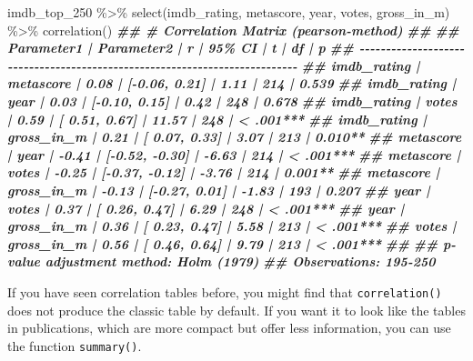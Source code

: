 \documentclass[
]{book}
\newenvironment{Shaded}{\begin{snugshade}}{\end{snugshade}}
\newcommand{\DocumentationTok}[1]{\textcolor[rgb]{0.56,0.35,0.01}{\textbf{\textit{#1}}}}
\newcommand{\FunctionTok}[1]{\textcolor[rgb]{0.00,0.00,0.00}{#1}}
\newcommand{\NormalTok}[1]{#1}
\newcommand{\SpecialCharTok}[1]{\textcolor[rgb]{0.00,0.00,0.00}{#1}}
\begin{document}
\begin{Shaded}
\begin{Highlighting}[]
\NormalTok{imdb\_top\_250 }\SpecialCharTok{\%\textgreater{}\%}
  \FunctionTok{select}\NormalTok{(imdb\_rating, metascore, year, votes, gross\_in\_m) }\SpecialCharTok{\%\textgreater{}\%}
  \FunctionTok{correlation}\NormalTok{()}
\DocumentationTok{\#\# \# Correlation Matrix (pearson{-}method)}
\DocumentationTok{\#\# }
\DocumentationTok{\#\# Parameter1  | Parameter2 |     r |         95\% CI |     t |  df |         p}
\DocumentationTok{\#\# {-}{-}{-}{-}{-}{-}{-}{-}{-}{-}{-}{-}{-}{-}{-}{-}{-}{-}{-}{-}{-}{-}{-}{-}{-}{-}{-}{-}{-}{-}{-}{-}{-}{-}{-}{-}{-}{-}{-}{-}{-}{-}{-}{-}{-}{-}{-}{-}{-}{-}{-}{-}{-}{-}{-}{-}{-}{-}{-}{-}{-}{-}{-}{-}{-}{-}{-}{-}{-}{-}{-}{-}{-}{-}{-}}
\DocumentationTok{\#\# imdb\_rating |  metascore |  0.08 | [{-}0.06,  0.21] |  1.11 | 214 | 0.539    }
\DocumentationTok{\#\# imdb\_rating |       year |  0.03 | [{-}0.10,  0.15] |  0.42 | 248 | 0.678    }
\DocumentationTok{\#\# imdb\_rating |      votes |  0.59 | [ 0.51,  0.67] | 11.57 | 248 | \textless{} .001***}
\DocumentationTok{\#\# imdb\_rating | gross\_in\_m |  0.21 | [ 0.07,  0.33] |  3.07 | 213 | 0.010**  }
\DocumentationTok{\#\# metascore   |       year | {-}0.41 | [{-}0.52, {-}0.30] | {-}6.63 | 214 | \textless{} .001***}
\DocumentationTok{\#\# metascore   |      votes | {-}0.25 | [{-}0.37, {-}0.12] | {-}3.76 | 214 | 0.001**  }
\DocumentationTok{\#\# metascore   | gross\_in\_m | {-}0.13 | [{-}0.27,  0.01] | {-}1.83 | 193 | 0.207    }
\DocumentationTok{\#\# year        |      votes |  0.37 | [ 0.26,  0.47] |  6.29 | 248 | \textless{} .001***}
\DocumentationTok{\#\# year        | gross\_in\_m |  0.36 | [ 0.23,  0.47] |  5.58 | 213 | \textless{} .001***}
\DocumentationTok{\#\# votes       | gross\_in\_m |  0.56 | [ 0.46,  0.64] |  9.79 | 213 | \textless{} .001***}
\DocumentationTok{\#\# }
\DocumentationTok{\#\# p{-}value adjustment method: Holm (1979)}
\DocumentationTok{\#\# Observations: 195{-}250}
\end{Highlighting}
\end{Shaded}

If you have seen correlation tables before, you might find that \texttt{correlation()} does not produce the classic table by default. If you want it to look like the tables in publications, which are more compact but offer less information, you can use the function \texttt{summary()}.
\end{document}
